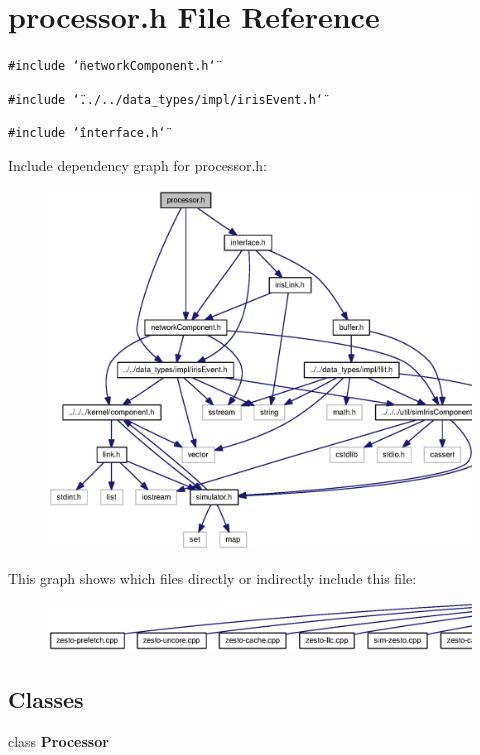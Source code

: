\section{processor.h File Reference}
\label{processor_8h}
{\tt \#include \char`\"{}networkComponent.h\char`\"{}}\par
{\tt \#include \char`\"{}../../data\_\-types/impl/irisEvent.h\char`\"{}}\par
{\tt \#include \char`\"{}interface.h\char`\"{}}\par


Include dependency graph for processor.h:\nopagebreak
\begin{figure}[H]
\begin{center}
\leavevmode
\includegraphics[width=330pt]{processor_8h__incl}
\end{center}
\end{figure}


This graph shows which files directly or indirectly include this file:\nopagebreak
\begin{figure}[H]
\begin{center}
\leavevmode
\includegraphics[width=420pt]{processor_8h__dep__incl}
\end{center}
\end{figure}
\subsection*{Classes}
\begin{CompactItemize}
\item 
class {\bf Processor}
\end{CompactItemize}

